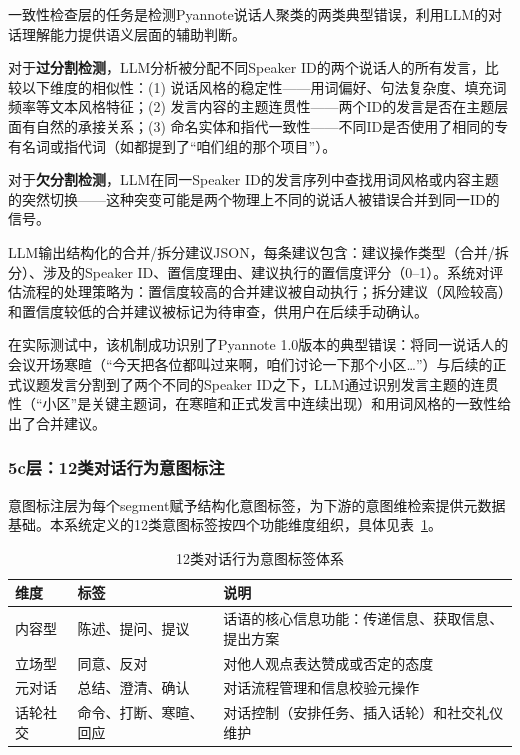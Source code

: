 \documentclass[12pt, a4paper]{article}
\begin{document}
一致性检查层的任务是检测Pyannote说话人聚类的两类典型错误，利用LLM的对话理解能力提供语义层面的辅助判断。

对于\textbf{过分割检测}，LLM分析被分配不同Speaker ID的两个说话人的所有发言，比较以下维度的相似性：(1) 说话风格的稳定性——用词偏好、句法复杂度、填充词频率等文本风格特征；(2) 发言内容的主题连贯性——两个ID的发言是否在主题层面有自然的承接关系；(3) 命名实体和指代一致性——不同ID是否使用了相同的专有名词或指代词（如都提到了``咱们组的那个项目''）。

对于\textbf{欠分割检测}，LLM在同一Speaker ID的发言序列中查找用词风格或内容主题的突然切换——这种突变可能是两个物理上不同的说话人被错误合并到同一ID的信号。

LLM输出结构化的合并/拆分建议JSON，每条建议包含：建议操作类型（合并/拆分）、涉及的Speaker ID、置信度理由、建议执行的置信度评分（0--1）。系统对评估流程的处理策略为：置信度较高的合并建议被自动执行；拆分建议（风险较高）和置信度较低的合并建议被标记为待审查，供用户在后续手动确认。

在实际测试中，该机制成功识别了Pyannote 1.0版本的典型错误：将同一说话人的会议开场寒暄（``今天把各位都叫过来啊，咱们讨论一下那个小区…''）与后续的正式议题发言分割到了两个不同的Speaker ID之下，LLM通过识别发言主题的连贯性（``小区''是关键主题词，在寒暄和正式发言中连续出现）和用词风格的一致性给出了合并建议。

\subsubsection{5c层：12类对话行为意图标注}

意图标注层为每个segment赋予结构化意图标签，为下游的意图维检索提供元数据基础。本系统定义的12类意图标签按四个功能维度组织，具体见表~\ref{tab:intent_labels}。

\begin{table}[H]
\centering
\caption{12类对话行为意图标签体系}
\label{tab:intent_labels}
\begin{tabular}{llp{5.5cm}}
\toprule
\textbf{维度} & \textbf{标签} & \textbf{说明} \\
\midrule
内容型 & 陈述、提问、提议 & 话语的核心信息功能：传递信息、获取信息、提出方案 \\
立场型 & 同意、反对 & 对他人观点表达赞成或否定的态度 \\
元对话 & 总结、澄清、确认 & 对话流程管理和信息校验元操作 \\
话轮社交 & 命令、打断、寒暄、回应 & 对话控制（安排任务、插入话轮）和社交礼仪维护 \\
\bottomrule
\end{tabular}
\end{table}
\end{document}
